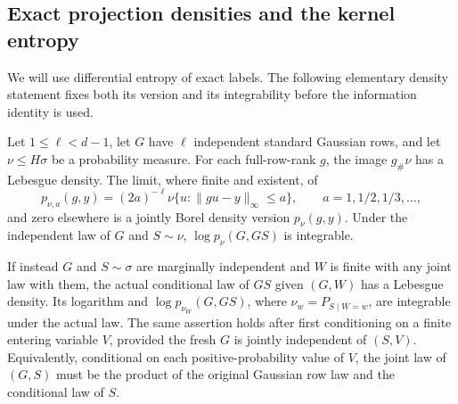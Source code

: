 \subsection{Exact projection densities and the kernel entropy}

We will use differential entropy of exact labels. The following
elementary density statement fixes both its version and its
integrability before the information identity is used.

\begin{lemma}\label{lk:density}
Let \(1\le\ell<d-1\), let \(G\) have \(\ell\) independent standard
Gaussian rows, and let \(\nu\le H\sigma\) be a probability measure.
For each full-row-rank \(g\), the image \(g_\#\nu\) has a Lebesgue
density. The limit, where finite and existent, of
\[
 p_{\nu,a}(g,y)=(2a)^{-\ell}
     \nu\{u:\|gu-y\|_\infty\le a\},
 \qquad a=1,1/2,1/3,\ldots,
\]
and zero elsewhere is a jointly Borel density version \(p_\nu(g,y)\).
Under the independent law of \(G\) and \(S\sim\nu\),
\(\log p_\nu(G,GS)\) is integrable.

If instead \(G\) and \(S\sim\sigma\) are marginally independent and
\(W\) is finite with any joint law with them, the actual conditional
law of \(GS\) given \((G,W)\) has a Lebesgue density. Its logarithm
and \(\log p_{\nu_W}(G,GS)\), where
\(\nu_w=P_{S\mid W=w}\), are integrable under the actual law.
The same assertion holds after first conditioning on a finite entering
variable \(V\), provided the fresh \(G\) is jointly independent of
\((S,V)\). Equivalently, conditional on each positive-probability value
of \(V\), the joint law of \((G,S)\) must be the product of the original
Gaussian row law and the conditional law of \(S\).
\end{lemma}
